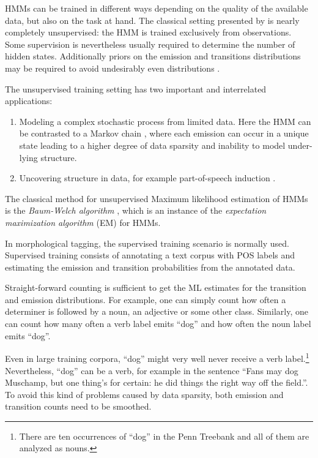 HMMs can be trained in different ways depending on the quality of the
available data, but also on the task at hand. The classical setting
presented by \cite{Rabiner1989} is nearly completely unsupervised: the
HMM is trained exclusively from observations. Some supervision is
nevertheless usually required to determine the number of hidden
states. Additionally priors on the
emission and transitions distributions may be required to avoid
undesirably even distributions
\citep{Cutting1992,Johnson2007}.

The unsupervised training setting has two important and
interrelated applications:
\begin{enumerate}
\item Modeling a complex stochastic process from limited data. Here
  the HMM can be contrasted to a Markov chain \citep[318--320]{Manning1999}, where
  each emission can occur in a unique state leading to a higher degree
  of data sparsity and inability to model under-lying structure.
\item Uncovering structure in data, for example part-of-speech
  induction \citep{Johnson2007}.
\end{enumerate}
The classical method for unsupervised Maximum likelihood estimation of
HMMs is the {\it Baum-Welch algorithm} \citep{Rabiner1989}, which is
an instance of the {\it expectation maximization algorithm} (EM)
\citep{Dempster1977} for HMMs.

In morphological tagging, the supervised training scenario is normally
used. Supervised training consists of annotating a text corpus with
POS labels and estimating the emission and transition probabilities
from the annotated data.

Straight-forward counting is sufficient to get the ML estimates for
the transition and emission distributions. For example, one can simply
count how often a determiner is followed by a noun, an adjective or
some other class. Similarly, one can count how many often a verb label
emits ``dog'' and how often the noun label emits ``dog''. 

Even in large training corpora, ``dog'' might very well never receive
a verb label.\footnote{There are ten occurrences of ``dog'' in the Penn
  Treebank and all of them are analyzed as nouns.} Nevertheless,
``dog'' can be a verb, for example in the sentence ``Fans may dog
Muschamp, but one thing's for certain: he did things the right way off
the field.''. To avoid this kind of problems caused by data sparsity,
both emission and transition counts need to be smoothed.

